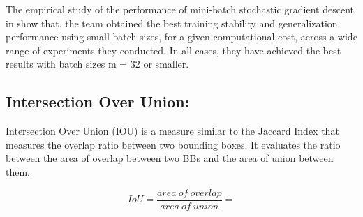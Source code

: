 The empirical study of the performance of mini-batch stochastic gradient descent in \cite{masters2018revisiting} show that, the team obtained the best training stability and generalization performance using small batch sizes, for a given computational cost, across a wide range of experiments they conducted. In all cases, they have achieved the best results with batch sizes m = 32 or smaller.

\subsection{Intersection Over Union:}
Intersection Over Union (IOU) is a measure similar to the Jaccard Index that measures the overlap ratio between two bounding boxes. It evaluates the ratio between the area of overlap between two BBs and the area of union between them.

\begin{equation}
    IoU = \frac{area\: of\: overlap} {area\: of\: union} =
\end{equation}

\begin{center}

\vspace{0.2cm}%

\end{center}

